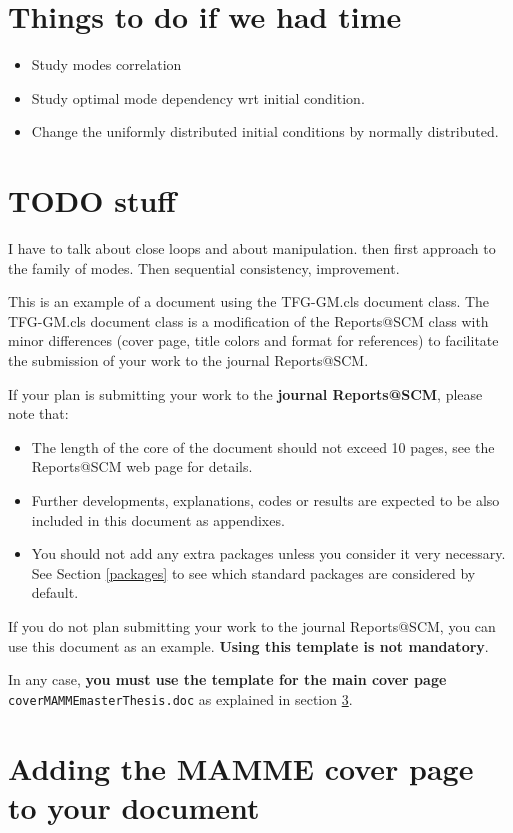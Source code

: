 \documentclass[12,twoside]{TFG-GM}
\theoremstyle{definition}
\theoremstyle{remark}
\begin{document}
\section{Things to do if we had time}
\label{sec:todo}
\begin{itemize}
\item Study modes correlation
\item Study optimal mode dependency wrt initial condition.
\item Change the uniformly distributed initial conditions by normally distributed.
\end{itemize}

\section{TODO stuff}
I have to talk about close loops and about manipulation. then first approach to the family of modes. Then sequential consistency, improvement.

This is an example of a document using the TFG-GM.cls document class. The TFG-GM.cls document class is a modification of the Reports@SCM class with minor differences (cover page, title colors and format for references) to facilitate the submission of your work to the journal Reports@SCM.

If your plan is submitting your work to the \textbf{journal Reports@SCM}, please note that:
\begin{itemize}
	\item The length of the core of the document should not exceed 10 pages, see the Reports@SCM web page for details.
	\item Further developments, explanations, codes or results are expected to be also included in this document as appendixes.
	\item You should not add any extra packages unless you consider it very necessary. See Section \ref{packages} to see which standard packages  are considered by default. 
\end{itemize} 

If you do not plan submitting your work to the journal  Reports@SCM, you can use this document as an example. \textbf{Using this template is not mandatory}.
 
In any case, \textbf{you must use the template for the main cover page} \texttt{coverMAMMEmasterThesis.doc} as explained in section \ref{sec:coverPage}.


\section{Adding the MAMME cover page to your document}
\label{sec:coverPage}
  
\end{document}

